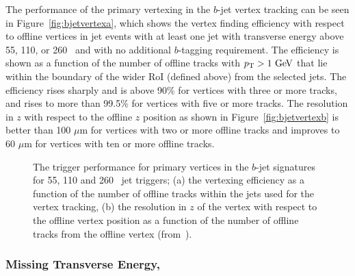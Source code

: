 				The performance of the primary vertexing in the $b$-jet vertex tracking can be seen in Figure~\ref{fig:bjetvertexa}, which shows the vertex finding efficiency with respect to 
				offline vertices in jet events with at least one jet with transverse energy above 55, 110, or 260 \GeV\ and with no additional $b$-tagging requirement. The efficiency is shown 
				as a function of the number of offline tracks with $\pt>1 \GeV$ that lie within the boundary of the wider RoI (defined above) from the selected jets. The efficiency rises sharply and 
				is above 90\% for vertices with three or more tracks, and rises to more than 99.5\% for vertices with five or more tracks. The resolution in $z$ with respect to the offline $z$ position as shown in Figure~\ref{fig:bjetvertexb} is better than 100 $\mu$m for vertices with two or more offline tracks and improves to 60 $\mu$m for vertices with ten or more offline tracks.

				\begin{figure}[!htb]
					\centering
					\caption{The trigger performance for primary vertices in the $b$-jet signatures for 55, 110 and 260 \GeV\ jet triggers; (a) the vertexing efficiency as a function of the number of offline tracks within the jets used for the vertex tracking, (b) the resolution in $z$ of the vertex with respect to the offline vertex position as a function of the number of offline tracks from the offline vertex (from~\cite{ATLASTrigger2015}).}
					\label{fig:bjetvertex}
				\end{figure}

			\subsubsection*{Missing Transverse Energy, \met}

